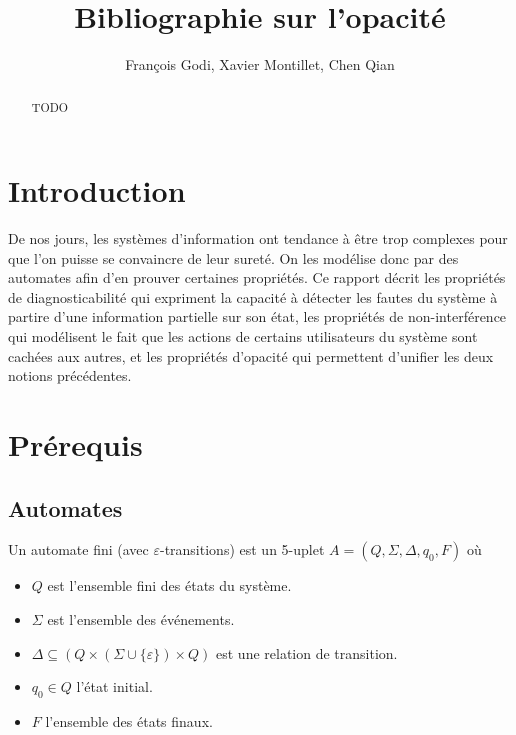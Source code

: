 \documentclass[10pt,a4paper]{article}
\begin{document}
    \title{Bibliographie sur l'opacit\'e}

    \author{François Godi, Xavier Montillet, Chen Qian}

\maketitle

\begin{abstract}
TODO
\end{abstract}

\section*{Introduction}

De nos jours, les syst\`emes d'information ont tendance \`a \^etre trop complexes pour que l'on puisse se convaincre de leur suret\'e. On les mod\'elise donc par des automates afin d'en prouver certaines propri\'et\'es. Ce rapport d\'ecrit les propri\'et\'es de diagnosticabilit\'e qui expriment la capacit\'e \`a d\'etecter les fautes du syst\`eme \`a partire d'une information partielle sur son \'etat, les propri\'et\'es de non-interf\'erence qui mod\'elisent le fait que les actions de certains utilisateurs du syst\`eme sont cach\'ees aux autres, et les propri\'et\'es d'opacit\'e qui permettent d'unifier les deux notions pr\'ec\'edentes.

\section{Pr\'erequis}

\subsection{Automates}

Un automate fini (avec $\varepsilon$-transitions) est un 5-uplet $A = (Q, \Sigma, \Delta, q_0, F)$ o\`u
\begin{itemize}
	\item $Q$ est l'ensemble fini des états du système.
	\item $\Sigma$ est l'ensemble des événements.
	\item $\Delta \subseteq (Q \times (\Sigma \cup \{\varepsilon\}) \times Q)$ est une relation de transition.
	\item $q_0 \in Q$ l'état initial.
	\item $F$ l'ensemble des \'etats finaux.
\end{itemize}
\end{document}
